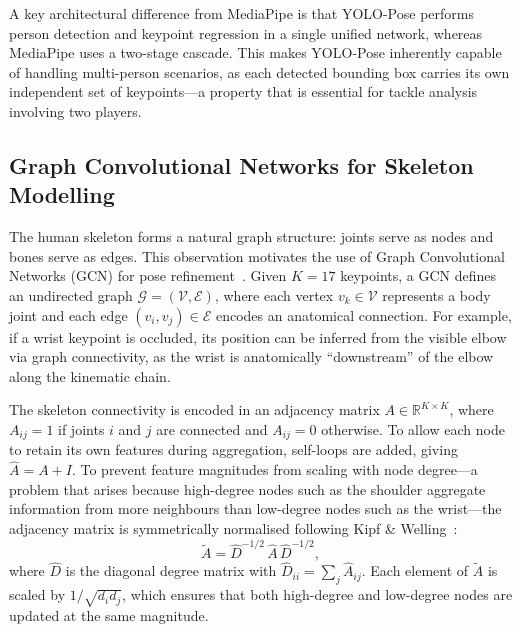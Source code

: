 \documentclass{article}
\begin{document}
A key architectural difference from MediaPipe is that YOLO-Pose performs
person detection and keypoint regression in a single unified network, whereas
MediaPipe uses a two-stage cascade.
This makes YOLO-Pose inherently capable of handling multi-person scenarios,
as each detected bounding box carries its own independent set of keypoints---a
property that is essential for tackle analysis involving two players.

\subsection{Graph Convolutional Networks for Skeleton Modelling}
\label{sec:lit:gcn}

The human skeleton forms a natural graph structure: joints serve as nodes and
bones serve as edges.
This observation motivates the use of Graph Convolutional Networks (GCN)
for pose refinement~\cite{kipf2017gcn}.
Given $K = 17$ keypoints, a GCN defines an undirected graph
$\mathcal{G} = (\mathcal{V}, \mathcal{E})$,
where each vertex $v_k \in \mathcal{V}$ represents a body joint and each
edge $(v_i, v_j) \in \mathcal{E}$ encodes an anatomical connection.
For example, if a wrist keypoint is occluded, its position can be inferred
from the visible elbow via graph connectivity, as the wrist is anatomically
``downstream'' of the elbow along the kinematic chain.

The skeleton connectivity is encoded in an adjacency matrix
$A \in \mathbb{R}^{K \times K}$, where $A_{ij} = 1$ if joints $i$ and $j$
are connected and $A_{ij} = 0$ otherwise.
To allow each node to retain its own features during aggregation, self-loops
are added, giving $\hat{A} = A + I$.
To prevent feature magnitudes from scaling with node degree---a problem that
arises because high-degree nodes such as the shoulder aggregate information
from more neighbours than low-degree nodes such as the wrist---the adjacency
matrix is symmetrically normalised following Kipf \&
Welling~\cite{kipf2017gcn}:
\begin{equation}
  \tilde{A} = \hat{D}^{-1/2}\,\hat{A}\,\hat{D}^{-1/2},
  \label{eq:norm_adj}
\end{equation}
where $\hat{D}$ is the diagonal degree matrix with
$\hat{D}_{ii} = \sum_{j} \hat{A}_{ij}$.
Each element of $\tilde{A}$ is scaled by $1/\!\sqrt{d_i d_j}$, which
ensures that both high-degree and low-degree nodes are updated at the
same magnitude.
\end{document}
